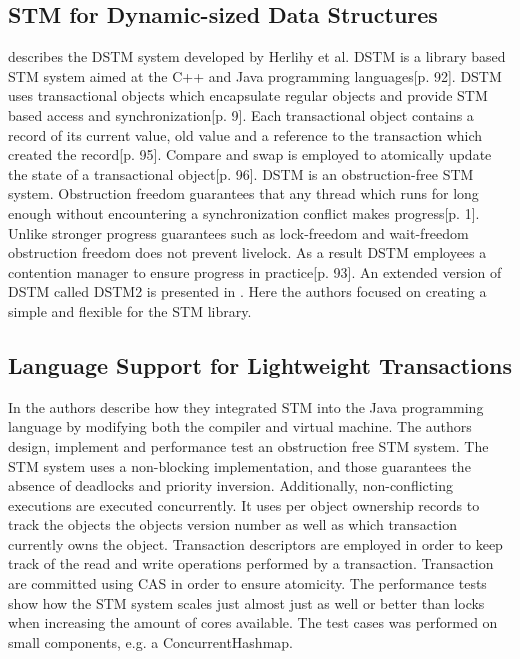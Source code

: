 \subsection{\ac{STM} for Dynamic-sized Data Structures}
\cite{herlihy2003software} describes the DSTM system developed by Herlihy et al. DSTM is a library based \ac{STM} system aimed at the C++ and Java programming languages\cite{herlihy2003software}[p. 92]. DSTM uses transactional objects which encapsulate regular objects and provide \ac{STM} based access and synchronization\cite{herlihy2003software}[p. 9]. Each transactional object contains a record of its current value, old value and a reference to the transaction which created the record\cite{herlihy2003software}[p. 95]. Compare and swap is employed to atomically update the state of a transactional object\cite{herlihy2003software}[p. 96]. DSTM is an obstruction-free\cite{herlihy2003obstruction} \ac{STM} system. Obstruction freedom guarantees that any thread which runs for long enough without encountering a synchronization conflict makes progress\cite{herlihy2003obstruction}[p. 1]. Unlike stronger progress guarantees such as lock-freedom and wait-freedom obstruction freedom does not prevent livelock. As a result DSTM employees a contention manager to ensure progress in practice\cite{herlihy2003software}[p. 93]. An extended version of DSTM called DSTM2 is presented in \cite{herlihy2006flexible}. Here the authors focused on creating a simple and flexible  for the \ac{STM} library.

\subsection{Language Support for Lightweight Transactions}
In \cite{harris2003language} the authors describe how they integrated \ac{STM} into the Java programming language by modifying both the compiler\cite[p. 4]{harris2003language} and virtual machine\cite[p. 9]{harris2003language}. The authors design, implement and performance test an obstruction free \ac{STM} system. The \ac{STM} system uses a non-blocking implementation, and those guarantees the absence of deadlocks and priority inversion. Additionally, non-conflicting executions are executed concurrently. It uses per object ownership records to track the objects the objects version number as well as which transaction currently owns the object\cite[p. 6]{harris2003language}. Transaction descriptors are employed in order to keep track of the read and write operations performed by a transaction. Transaction are committed  using \ac{CAS} in order to ensure atomicity\cite[p. 7]{harris2003language}. The performance tests show how the \ac{STM} system scales just almost just as well or better than locks when increasing the amount of cores available\cite[p. 12]{harris2003language}. The test cases was performed on small components, e.g. a ConcurrentHashmap.


